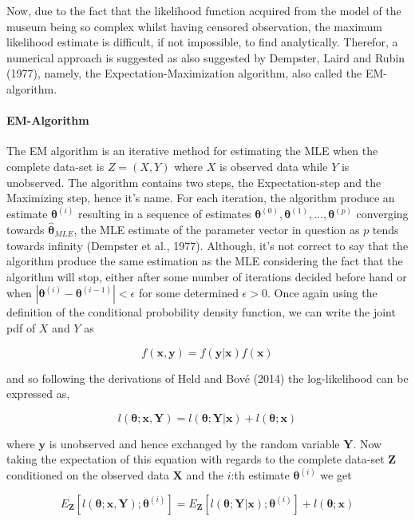 \documentclass[]{article}
\let\oldparagraph\paragraph
\renewcommand{\paragraph}[1]{\oldparagraph{#1}\mbox{}}
\begin{document}
Now, due to the fact that the likelihood function acquired from the
model of the museum being so complex whilst having censored observation,
the maximum likelihood estimate is difficult, if not impossible, to find
analytically. Therefor, a numerical approach is suggested as also
suggested by Dempster, Laird and Rubin (1977), namely, the
Expectation-Maximization algorithm, also called the EM-algorithm.

\hypertarget{em-algorithm}{%
\paragraph{EM-Algorithm}\label{em-algorithm}}

The EM algorithm is an iterative method for estimating the MLE when the
complete data-set is \(Z=(X,Y)\) where \(X\) is observed data while
\(Y\) is unobserved. The algorithm contains two steps, the
Expectation-step and the Maximizing step, hence it's name. For each
iteration, the algorithm produce an estimate \(\mathbf{\theta}^{(i)}\)
resulting in a sequence of estimates
\(\mathbf{\theta}^{(0)}, \mathbf{\theta}^{(1)},...,\mathbf{\theta}^{(p)}\)
converging towards \(\hat{\mathbf{\theta}}_{MLE}\), the MLE estimate of
the parameter vector in question as \(p\) tends towards infinity
(Dempster et al., 1977). Although, it's not correct to say that the
algorithm produce the same estimation as the MLE considering the fact
that the algorithm will stop, either after some number of iterations
decided before hand or when
\(|\mathbf{\theta}^{(i)} - \mathbf{\theta}^{(i-1)}| < \epsilon\) for
some determined \(\epsilon > 0\). Once again using the definition of the
conditional probobility density function, we can write the joint pdf of
\(X\) and \(Y\) as

\[
f(\mathbf{x},\mathbf{y}) = f(\mathbf{y}|\mathbf{x}) f(\mathbf{x})
\]

and so following the derivations of Held and Bové (2014) the
log-likelihood can be expressed as,

\[
l(\mathbf{\theta};\mathbf{x},\mathbf{Y}) = l(\mathbf{\theta};\mathbf{Y}|\mathbf{x}) + l(\mathbf{\theta};\mathbf{x})
\]

where \(\mathbf{y}\) is unobserved and hence exchanged by the random
variable \(\mathbf{Y}\). Now taking the expectation of this equation
with regards to the complete data-set \(\mathbf{Z}\) conditioned on the
observed data \(\mathbf{X}\) and the \(i\):th estimate
\(\mathbf{\theta}^{(i)}\) we get

\[
E_{\mathbf{Z}}[l(\mathbf{\theta};\mathbf{x},\mathbf{Y}) ; \mathbf{\theta}^{(i)}] = E_\mathbf{Z}[l(\mathbf{\theta};\mathbf{Y}|\mathbf{x}); \mathbf{\theta}^{(i)}] + l(\mathbf{\theta};\mathbf{x})
\]
\end{document}
